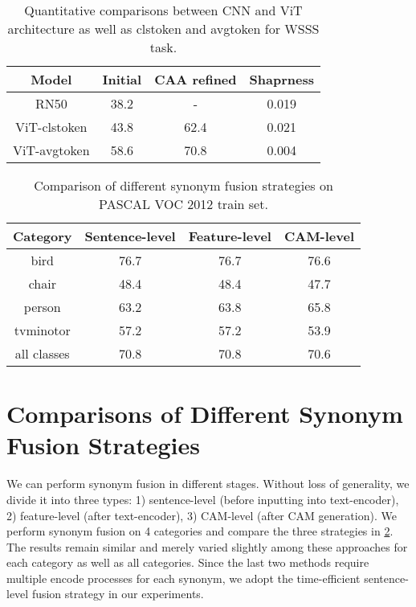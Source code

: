 \documentclass[10pt,twocolumn,letterpaper]{article}
\begin{document}
\begin{table}
  \centering
  \begin{tabular}{cccc}
    \toprule
    Model  & Initial & CAA refined & Shaprness \\
    \midrule
    RN50   & 38.2       & -  &  0.019 \\
    ViT-clstoken      & 43.8       & 62.4  &  0.021 \\
    ViT-avgtoken     & 58.6       & 70.8  &  0.004 \\
    \bottomrule
  \end{tabular}
  \caption{Quantitative comparisons between CNN and ViT architecture as well as clstoken and avgtoken for WSSS task.}
  \label{tab:cnn_vit_cls}
\end{table}

\begin{table}
  \centering
  \begin{tabular}{cccc}
    \toprule
    Category  & Sentence-level & Feature-level & CAM-level \\
    \midrule
bird      & 76.7 & 76.7 & 76.6 \\
    chair     & 48.4 & 48.4 & 47.7 \\
    person    & 63.2 & 63.8 & 65.8 \\
    tvminotor & 57.2 & 57.2 & 53.9 \\
    all classes  & 70.8 & 70.8 & 70.6 \\
    \bottomrule
  \end{tabular}
  \caption{Comparison of different synonym fusion strategies on PASCAL VOC 2012 train set.}
  \label{tab:different synonym fusion}
  \vspace{-2mm}
\end{table}

\section{Comparisons of Different Synonym Fusion Strategies}
We can perform synonym fusion in different stages. Without loss of generality, we divide it into three types: 1) sentence-level (before inputting into text-encoder), 2) feature-level (after text-encoder), 3) CAM-level (after CAM generation). We perform synonym fusion on 4 categories and compare the three strategies in \cref{tab:different synonym fusion}. The results remain similar and merely varied slightly among these approaches for each category as well as all categories. Since the last two methods require multiple encode processes for each synonym, we adopt the time-efficient sentence-level fusion strategy in our experiments.
\end{document}
